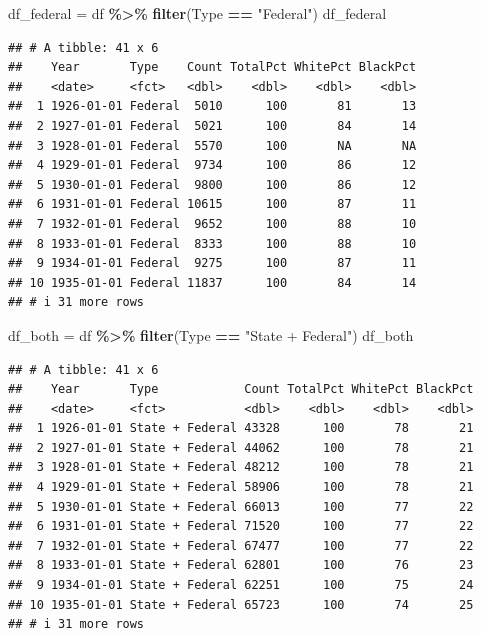 \documentclass[
]{article}
\newenvironment{Shaded}{\begin{snugshade}}{\end{snugshade}}
\newcommand{\FunctionTok}[1]{\textcolor[rgb]{0.13,0.29,0.53}{\textbf{#1}}}
\newcommand{\NormalTok}[1]{#1}
\newcommand{\OtherTok}[1]{\textcolor[rgb]{0.56,0.35,0.01}{#1}}
\newcommand{\SpecialCharTok}[1]{\textcolor[rgb]{0.81,0.36,0.00}{\textbf{#1}}}
\newcommand{\StringTok}[1]{\textcolor[rgb]{0.31,0.60,0.02}{#1}}
\begin{document}
\begin{Shaded}
\begin{Highlighting}[]
\NormalTok{df\_federal }\OtherTok{=}\NormalTok{ df }\SpecialCharTok{\%\textgreater{}\%} \FunctionTok{filter}\NormalTok{(Type }\SpecialCharTok{==} \StringTok{"Federal"}\NormalTok{)}
\NormalTok{df\_federal}
\end{Highlighting}
\end{Shaded}

\begin{verbatim}
## # A tibble: 41 x 6
##    Year       Type    Count TotalPct WhitePct BlackPct
##    <date>     <fct>   <dbl>    <dbl>    <dbl>    <dbl>
##  1 1926-01-01 Federal  5010      100       81       13
##  2 1927-01-01 Federal  5021      100       84       14
##  3 1928-01-01 Federal  5570      100       NA       NA
##  4 1929-01-01 Federal  9734      100       86       12
##  5 1930-01-01 Federal  9800      100       86       12
##  6 1931-01-01 Federal 10615      100       87       11
##  7 1932-01-01 Federal  9652      100       88       10
##  8 1933-01-01 Federal  8333      100       88       10
##  9 1934-01-01 Federal  9275      100       87       11
## 10 1935-01-01 Federal 11837      100       84       14
## # i 31 more rows
\end{verbatim}

\begin{Shaded}
\begin{Highlighting}[]
\NormalTok{df\_both }\OtherTok{=}\NormalTok{ df }\SpecialCharTok{\%\textgreater{}\%} \FunctionTok{filter}\NormalTok{(Type }\SpecialCharTok{==} \StringTok{"State + Federal"}\NormalTok{)}
\NormalTok{df\_both}
\end{Highlighting}
\end{Shaded}

\begin{verbatim}
## # A tibble: 41 x 6
##    Year       Type            Count TotalPct WhitePct BlackPct
##    <date>     <fct>           <dbl>    <dbl>    <dbl>    <dbl>
##  1 1926-01-01 State + Federal 43328      100       78       21
##  2 1927-01-01 State + Federal 44062      100       78       21
##  3 1928-01-01 State + Federal 48212      100       78       21
##  4 1929-01-01 State + Federal 58906      100       78       21
##  5 1930-01-01 State + Federal 66013      100       77       22
##  6 1931-01-01 State + Federal 71520      100       77       22
##  7 1932-01-01 State + Federal 67477      100       77       22
##  8 1933-01-01 State + Federal 62801      100       76       23
##  9 1934-01-01 State + Federal 62251      100       75       24
## 10 1935-01-01 State + Federal 65723      100       74       25
## # i 31 more rows
\end{verbatim}
\end{document}
